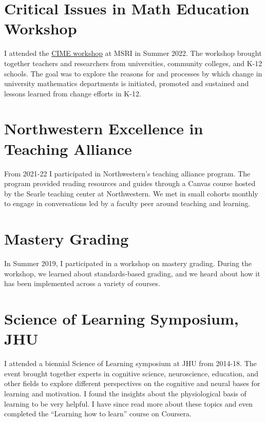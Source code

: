 \documentclass[
]{report}
\begin{document}
\hypertarget{critical-issues-in-math-education-workshop}{%
\section{Critical Issues in Math Education Workshop}\label{critical-issues-in-math-education-workshop}}

I attended the \href{https://www.msri.org/workshops/1028}{CIME workshop} at MSRI in Summer 2022.
The workshop brought together teachers and researchers from universities, community colleges, and K-12 schools. The goal was to explore the reasons for and processes by which change in university mathematics departments is initiated, promoted and sustained and lessons learned from change efforts in K-12.

\hypertarget{northwestern-excellence-in-teaching-alliance}{%
\section{Northwestern Excellence in Teaching Alliance}\label{northwestern-excellence-in-teaching-alliance}}

From 2021-22 I participated in Northwestern's teaching alliance program.
The program provided reading resources and guides through a Canvas course hosted by the Searle teaching center at Northwestern.
We met in small cohorts monthly to engage in conversations led by a faculty peer around teaching and learning.

\hypertarget{mastery-grading}{%
\section{Mastery Grading}\label{mastery-grading}}

In Summer 2019, I participated in a workshop on mastery grading.
During the workshop, we learned about standards-based grading, and we heard about how it has been implemented across a variety of courses.

\hypertarget{science-of-learning-symposium-jhu}{%
\section{Science of Learning Symposium, JHU}\label{science-of-learning-symposium-jhu}}

I attended a biennial Science of Learning symposium at JHU from 2014-18.
The event brought together experts in cognitive science, neuroscience, education, and other fields to explore different perspectives on the cognitive and neural bases for learning and motivation.
I found the insights about the physiological basis of learning to be very helpful.
I have since read more about these topics and even completed the ``Learning how to learn'' course on Coursera.
\end{document}
